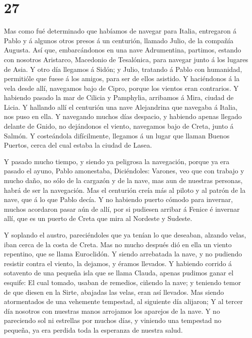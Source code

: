 \hypertarget{section-26}{%
\section{27}\label{section-26}}

 Mas como fué determinado que habíamos de navegar para
Italia, entregaron á Pablo y á algunos otros presos á un centurión,
llamado Julio, de la compañía Augusta.  Así que,
embarcándonos en una nave Adrumentina, partimos, estando con nosotros
Aristarco, Macedonio de Tesalónica, para navegar junto á los lugares de
Asia.  Y otro día llegamos á Sidón; y Julio, tratando á
Pablo con humanidad, permitióle que fuese á los amigos, para ser de
ellos asistido.  Y haciéndonos á la vela desde allí,
navegamos bajo de Cipro, porque los vientos eran contrarios.
 Y habiendo pasado la mar de Cilicia y Pamphylia, arribamos
á Mira, ciudad de Licia.  Y hallando allí el centurión una
nave Alejandrina que navegaba á Italia, nos puso en ella.  Y
navegando muchos días despacio, y habiendo apenas llegado delante de
Gnido, no dejándonos el viento, navegamos bajo de Creta, junto á Salmón.
 Y costeándola difícilmente, llegamos á un lugar que llaman
Buenos Puertos, cerca del cual estaba la ciudad de Lasea.

 Y pasado mucho tiempo, y siendo ya peligrosa la navegación,
porque ya era pasado el ayuno, Pablo amonestaba, 
Diciéndoles: Varones, veo que con trabajo y mucho daño, no sólo de la
cargazón y de la nave, mas aun de nuestras personas, habrá de ser la
navegación.  Mas el centurión creía más al piloto y al
patrón de la nave, que á lo que Pablo decía.  Y no habiendo
puerto cómodo para invernar, muchos acordaron pasar aún de allí, por si
pudiesen arribar á Fenice é invernar allí, que es un puerto de Creta que
mira al Nordeste y Sudeste.

 Y soplando el austro, pareciéndoles que ya tenían lo que
deseaban, alzando velas, iban cerca de la costa de Creta. 
Mas no mucho después dió en ella un viento repentino, que se llama
Euroclidón.  Y siendo arrebatada la nave, y no pudiendo
resistir contra el viento, la dejamos, y éramos llevados. 
Y habiendo corrido á sotavento de una pequeña isla que se llama Clauda,
apenas pudimos ganar el esquife:  El cual tomado, usaban de
remedios, ciñendo la nave; y teniendo temor de que diesen en la Sirte,
abajadas las velas, eran así llevados.  Mas siendo
atormentados de una vehemente tempestad, al siguiente día alijaron;
 Y al tercer día nosotros con nuestras manos arrojamos los
aparejos de la nave.  Y no pareciendo sol ni estrellas por
muchos días, y viniendo una tempestad no pequeña, ya era perdida toda la
esperanza de nuestra salud.


